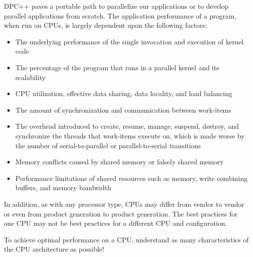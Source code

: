 DPC++ paves a portable path to parallelize our applications or to develop parallel applications from scratch. The application performance of a program, when run on CPUs, is largely dependent upon the following factors:\par

\begin{itemize}
	\item The underlying performance of the single invocation and execution of kernel code
	\item The percentage of the program that runs in a parallel kernel and its scalability
	\item CPU utilization, effective data sharing, data locality, and load balancing
	\item The amount of synchronization and communication between work-items
	\item The overhead introduced to create, resume, manage, suspend, destroy, and synchronize the threads that work-items execute on, which is made worse by the 
	number of serial-to-parallel or parallel-to-serial transitions
	\item Memory conflicts caused by shared memory or falsely shared memory
	\item Performance limitations of shared resources such as memory, write combining buffers, and memory bandwidth
\end{itemize}

In addition, as with any processor type, CPUs may differ from vendor to vendor or even from product generation to product generation. The best practices for one CPU may not be best practices for a different CPU and configuration.\par

\begin{tcolorbox}[colback=red!5!white,colframe=red!75!black]
To achieve optimal performance on a CPU, understand as many characteristics of the CPU architecture as possible!
\end{tcolorbox}











